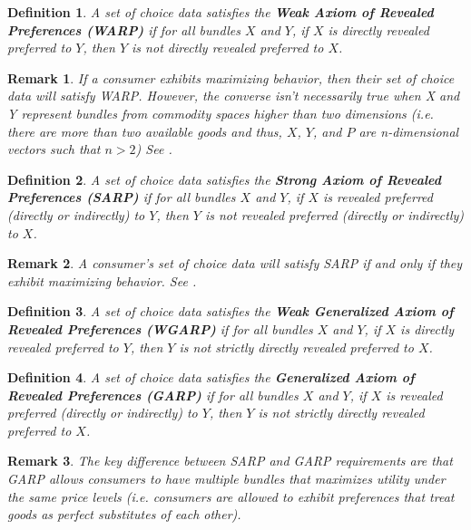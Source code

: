 \documentclass{article} %
\newtheorem{definition}{Definition} %
\newtheorem{remark}{Remark}
\begin{document}
\begin{definition}
A set of choice data satisfies the \textbf{Weak Axiom of Revealed Preferences (WARP)} if for all bundles $X$ and $Y$, if $X$ is directly revealed preferred to $Y$, then $Y$ is not directly revealed preferred to $X$.
\end{definition}

\begin{remark}
If a consumer exhibits maximizing behavior, then their set of choice data will satisfy WARP. However, the converse isn't necessarily true when X and Y represent bundles from commodity spaces higher than two dimensions (i.e. there are more than two available goods and thus, $X$, $Y$, and $P$ are n-dimensional vectors such that $n> 2$)  See \citet{Rose1958Consistency-of-Preference:-The-Two-Commodity-Case}. 
\end{remark}

\begin{definition}
A set of choice data satisfies the \textbf{Strong Axiom of Revealed Preferences (SARP)} if for all bundles $X$ and $Y$, if $X$ is revealed preferred (directly or indirectly) to $Y$, then $Y$ is not revealed preferred (directly or indirectly) to $X$.
\end{definition}

\begin{remark}
A consumer's set of choice data will satisfy SARP if and only if they exhibit maximizing behavior. See \citet{Samuelson1938A-Note-on-the-Pure-Theory-of-Consumer's-Behaviour}.
\end{remark}

\begin{definition}
A set of choice data satisfies the \textbf{Weak Generalized Axiom of Revealed Preferences (WGARP)} if for all bundles $X$ and $Y$, if $X$ is directly revealed preferred to $Y$, then $Y$ is not strictly directly revealed preferred to $X$.
\end{definition}

\begin{definition}
A set of choice data satisfies the \textbf{Generalized Axiom of Revealed Preferences (GARP)} if for all bundles $X$ and $Y$, if $X$ is revealed preferred (directly or indirectly) to $Y$, then $Y$ is not strictly directly revealed preferred to $X$.
\end{definition}

\begin{remark}
The key difference between SARP and GARP requirements are that GARP allows consumers to have multiple bundles that maximizes utility under the same price levels (i.e. consumers are allowed to exhibit preferences that treat goods as perfect substitutes of each other).
\end{remark}
\end{document}
